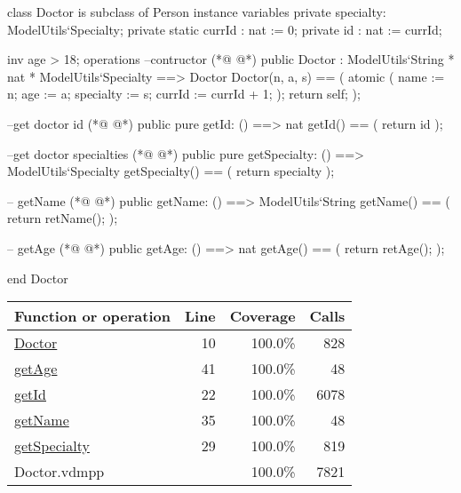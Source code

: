 \begin{vdmpp}[breaklines=true]
class Doctor is subclass of Person
instance variables
 private specialty: ModelUtils`Specialty;
 private static currId : nat := 0;
 private id : nat := currId;
 
 inv age > 18;
operations
 --contructor
(*@
\label{Doctor:10}
@*)
  public Doctor : ModelUtils`String * nat * ModelUtils`Specialty ==> Doctor
  Doctor(n, a, s) == (
   atomic (
    name := n;
    age := a;
    specialty := s;
    currId := currId + 1;
   );
   return self;
  );
  
  --get doctor id
(*@
\label{getId:22}
@*)
  public pure getId: () ==> nat
  getId() == (
   return id
  );
  
  
  --get doctor specialties
(*@
\label{getSpecialty:29}
@*)
  public pure getSpecialty: () ==> ModelUtils`Specialty
  getSpecialty() == (
   return specialty
  );
  
  -- getName
(*@
\label{getName:35}
@*)
  public getName: () ==> ModelUtils`String
  getName() == (
    return retName();  
  );

  -- getAge 
(*@
\label{getAge:41}
@*)
  public getAge: () ==> nat
  getAge() == (
    return retAge();  
  );

end Doctor
\end{vdmpp}
\bigskip
\begin{longtable}{|l|r|r|r|}
\hline
Function or operation & Line & Coverage & Calls \\
\hline
\hline
\hyperref[Doctor:10]{Doctor} & 10&100.0\% & 828 \\
\hline
\hyperref[getAge:41]{getAge} & 41&100.0\% & 48 \\
\hline
\hyperref[getId:22]{getId} & 22&100.0\% & 6078 \\
\hline
\hyperref[getName:35]{getName} & 35&100.0\% & 48 \\
\hline
\hyperref[getSpecialty:29]{getSpecialty} & 29&100.0\% & 819 \\
\hline
\hline
Doctor.vdmpp & & 100.0\% & 7821 \\
\hline
\end{longtable}

